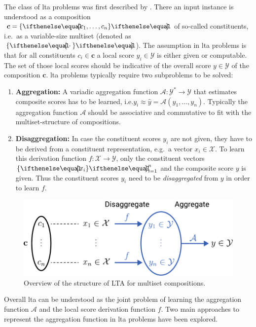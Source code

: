 The class of \ac{lta} problems was first described by \citet{Melnikov2016}.
There an input instance is understood as a composition $\bm{c} = \ldblbrace c_1, \dots, c_n \rdblbrace$ of so-called constituents, i.e.\ as a variable-size multiset (denoted as $\ldblbrace \cdot \rdblbrace$).
The assumption in \ac{lta} problems is that for all constituents $c_i \in \bm{c}$ a local score $y_i \in \mathcal{Y}$ is either given or computable.
The set of those local scores should be indicative of the overall score $y \in \mathcal{Y}$ of the composition $\bm{c}$.
\ac{lta} problems typically require two subproblems to be solved:
\begin{enumerate}[label=\textbf{\arabic*.}]
	\item \textbf{Aggregation:}
		A variadic aggregation function $\mathcal{A}: \mathcal{Y}^{*} \to \mathcal{Y}$ that estimates composite scores has to be learned, i.e.\@ $y_i \approx \hat{y} = \mathcal{A}(y_{1}, \dots, y_{n})$.
		Typically the aggregation function $\mathcal{A}$ should be associative and commutative to fit with the multiset-structure of compositions.
	\item \textbf{Disaggregation:}
		In case the constituent scores $y_i$ are not given, they have to be derived from a constituent representation, e.g.\ a vector $x_i \in \mathcal{X}$.
		To learn this derivation function $f: \mathcal{X} \to \mathcal{Y}$, only the constituent vectors ${\ldblbrace x_i \rdblbrace}_{i = 1}^{n}$ and the composite score $y$ is given.
		Thus the constituent scores $y_i$ need to be \textit{disaggregated} from $y$ in order to learn $f$.
\end{enumerate}
\begin{figure}[ht]
	\centering
	\includegraphics[width=0.7\linewidth]{gfx/related-work/lta-overview.pdf}
	\caption{Overview of the structure of LTA for multiset compositions.}\label{fig:related:lta-overview}
\end{figure}
Overall \ac{lta} can be understood as the joint problem of learning the aggregation function $\mathcal{A}$ and the local score derivation function $f$.
Two main approaches to represent the aggregation function in \ac{lta} problems have been explored.

